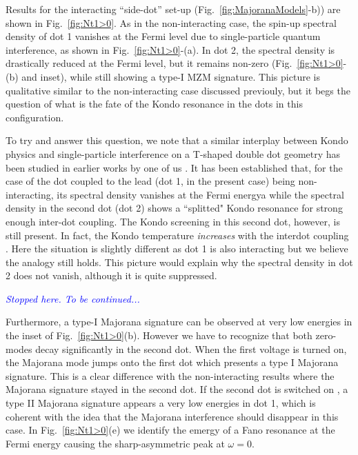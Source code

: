 \documentclass[showpacs,aps,prb,reprint,superscriptaddress]{revtex4-1}
\newcommand{\LUIS}[1]{\textcolor{blue}{\fbox{Luis} {\sl#1}}}
\begin{document}

 Results for the interacting ``side-dot'' set-up (Fig.\ \ref{fig:MajoranaModels}-b)) are shown in Fig.\ \ref{fig:Nt1>0}. As in the non-interacting case, the spin-up spectral density of dot 1  vanishes at the Fermi level due to single-particle quantum interference, as shown in Fig.\ \ref{fig:Nt1>0}-(a). In dot 2, the spectral density is drastically reduced at the Fermi level, but it remains non-zero (Fig.\ \ref{fig:Nt1>0}-(b) and inset), while still showing a type-I MZM signature. This picture is qualitative similar to the non-interacting case discussed previouly, but it begs the question of what is the fate of the Kondo resonance in the dots in this configuration.

To try and answer this question, we note that a similar interplay between Kondo physics and single-particle interference on a T-shaped double dot geometry has been studied in earlier works by one of us \cite{Silva:096603:2006,dias_da_silva_transmission_2008,DiasdaSilva:Phys.Rev.Lett.:116801:2017}. It has been established that, for the case of the dot coupled to the lead (dot 1, in the present case) being non-interacting, its spectral density vanishes at the Fermi energya while the spectral density in the second dot (dot 2) shows a ``splitted" Kondo resonance for strong enough inter-dot coupling. The Kondo screening in this second dot, however, is still present. In fact, the Kondo temperature \textit{increases} with the interdot coupling \cite{Silva:096603:2006,DiasdaSilva:Phys.Rev.Lett.:116801:2017}. Here the situation is slightly different as dot 1 is also interacting but we believe the analogy still holds. This picture would explain why the spectral density in dot 2 does not vanish, although it is quite suppressed. 


\LUIS{Stopped here. To be continued...}

  

Furthermore, a type-I Majorana signature can be observed at very low energies in the inset of Fig.\ \ref{fig:Nt1>0}(b). However we have to recognize that both zero-modes decay significantly in the second dot. When the first voltage is turned on, the Majorana mode jumps onto the first dot which presents a type I Majorana signature. This is a clear difference with the non-interacting results where the Majorana signature stayed in the second dot.  If the second dot is switched on , a type II Majorana signature appears a very low energies in dot 1, which is coherent with the idea that the Majorana interference should disappear in this case. In Fig.\ \ref{fig:Nt1>0}(e) we identify the emergy of a Fano resonance at the Fermi energy causing the sharp-asymmetric peak at $\omega = 0$. 
\end{document}

